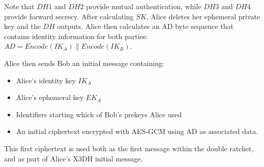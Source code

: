 Note that $DH1$ and $DH2$ provide mutual authentication, while $DH3$ and $DH4$ provide forward secrecy. After calculating $SK$, Alice deletes her ephemeral private key and the $DH$ outputs. Alice then calculates an AD byte sequence that contains identity information for both parties: $AD = Encode(IK_A) \| Encode(IK_B)$.

Alice then sends Bob an initial message containing:

\begin{itemize}
  \item Alice's identity key $IK_A$
  \item Alice's ephemeral key $EK_A$
  \item Identifiers starting which of Bob's prekeys Alice used
  \item An initial ciphertext encrypted with AES-GCM using AD as associated data.
\end{itemize}

This first ciphertext is used both as the first message within the double ratchet, and as part of Alice's X3DH initial message.
